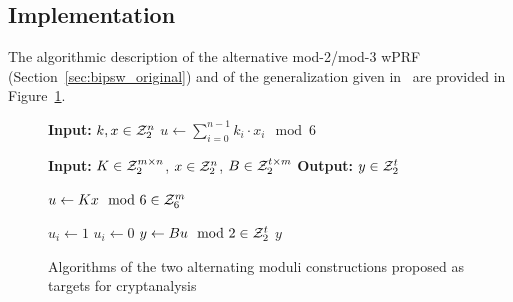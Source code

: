\subsection{Implementation}
The algorithmic description of the alternative mod-2/mod-3 wPRF (Section~\ref{sec:bipsw_original}) and of the generalization given in~\cite{C:DGHIKS21} are provided in Figure~\ref{fig:bispw_alg}.  

\begin{figure}[ht]
\centering
\begin{minipage}[t]{0.47\textwidth}
\begin{algorithm}[H]
  \caption{\label{alg:bipsw}The mod-2/mod-3 wPRF} 
  \begin{algorithmic} 
    \State \textbf{Input:} $k,x \in \mathcal{Z}_2^n$
    \State $u \leftarrow \sum_{i=0}^{n-1} k_i \cdot x_i \mod 6$ 
      \State {} 
    \Else
      \State {}
    \EndIf
  \end{algorithmic}
\end{algorithm}
\end{minipage}
\hfill
\begin{minipage}[t]{0.47\textwidth}
\begin{algorithm}[H]
  \caption{\label{alg:dgh_mod6}Mod-6 version of the \cite{C:DGHIKS21} construction}
  \begin{algorithmic}
    \State \textbf{Input:} $K \in \mathcal{Z}_2^{m \times n}$, $x \in \mathcal{Z}_2^n$, $B \in \mathcal{Z}_2^{t \times m}$
    \State \textbf{Output:} $y \in \mathcal{Z}_2^t$
    
    \State $u \gets Kx \mod 6 \in \mathcal{Z}_6^m$ 
    
        \State $u_i \gets 1$
      \Else
        \State $u_i \gets 0$
      \EndIf
    \EndFor
    \State $y \gets B u \mod 2 \in \mathcal{Z}_2^t$
     \State \Return $y$
  \end{algorithmic}
\end{algorithm}
\end{minipage}
\caption{\label{fig:bispw_alg} Algorithms of the two alternating moduli constructions proposed as targets for cryptanalysis}
\end{figure}


